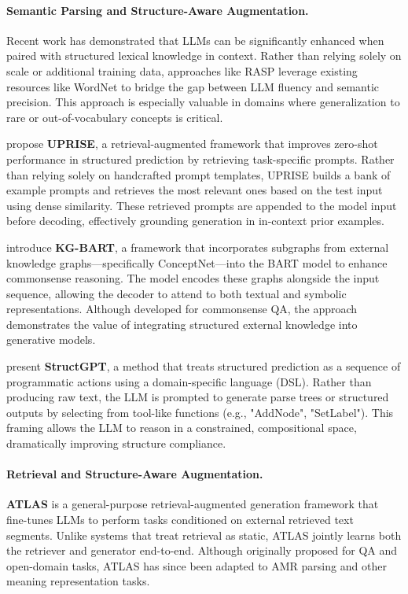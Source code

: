 \paragraph{Semantic Parsing and Structure-Aware Augmentation.} Recent work has demonstrated that LLMs can be significantly enhanced when paired with structured lexical knowledge in context. Rather than relying solely on scale or additional training data, approaches like RASP leverage existing resources like WordNet to bridge the gap between LLM fluency and semantic precision. This approach is especially valuable in domains where generalization to rare or out-of-vocabulary concepts is critical.

\citet{cheng2023uprise} propose \textbf{UPRISE}, a retrieval-augmented framework that improves zero-shot performance in structured prediction by retrieving task-specific prompts. Rather than relying solely on handcrafted prompt templates, UPRISE builds a bank of example prompts and retrieves the most relevant ones based on the test input using dense similarity. These retrieved prompts are appended to the model input before decoding, effectively grounding generation in in-context prior examples.

\citet{liu2021kgbart} introduce \textbf{KG-BART}, a framework that incorporates subgraphs from external knowledge graphs—specifically ConceptNet—into the BART model to enhance commonsense reasoning. The model encodes these graphs alongside the input sequence, allowing the decoder to attend to both textual and symbolic representations. Although developed for commonsense QA, the approach demonstrates the value of integrating structured external knowledge into generative models.

\citet{lu2023structgpt} present \textbf{StructGPT}, a method that treats structured prediction as a sequence of programmatic actions using a domain-specific language (DSL). Rather than producing raw text, the LLM is prompted to generate parse trees or structured outputs by selecting from tool-like functions (e.g., "AddNode", "SetLabel"). This framing allows the LLM to reason in a constrained, compositional space, dramatically improving structure compliance.

\paragraph{Retrieval and Structure-Aware Augmentation.} \textbf{ATLAS} \citep{izacard2024atlas} is a general-purpose retrieval-augmented generation framework that fine-tunes LLMs to perform tasks conditioned on external retrieved text segments. Unlike systems that treat retrieval as static, ATLAS jointly learns both the retriever and generator end-to-end. Although originally proposed for QA and open-domain tasks, ATLAS has since been adapted to AMR parsing and other meaning representation tasks.

